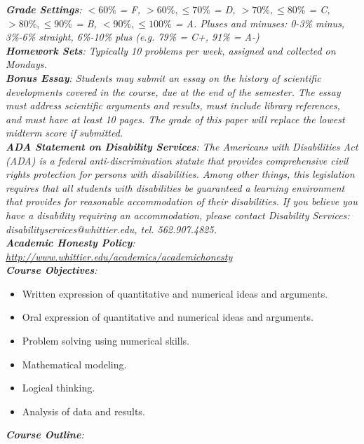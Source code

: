 \documentclass[10pt]{article}
\begin{document}
\textit{\textbf{Grade Settings}: $<60\%$ = F, $>60\%,\leq 70\%$ = D, $>70\%,\leq80\%$ = C, $>80\%,\leq 90\%$ = B, $<90\%,\leq 100\%$ = A.  Pluses and minuses: 0-3\% minus, 3\%-6\% straight, 6\%-10\% plus (e.g. 79\% = C+, 91\% = A-)} \\
\textit{\textbf{Homework Sets}: Typically 10 problems per week, assigned and collected on Mondays.} \\
\textit{\textbf{Bonus Essay}: Students may submit an essay on the history of scientific developments covered in the course, due at the end of the semester.  The essay must address scientific arguments and results, must include library references, and must have at least 10 pages.  The grade of this paper will replace the lowest midterm score if submitted.} \\
\textit{\textbf{ADA Statement on Disability Services}: The Americans with Disabilities Act (ADA) is a federal anti-discrimination statute that provides comprehensive civil rights protection for persons with disabilities. Among other things, this legislation requires that all students with disabilities be guaranteed a learning environment that provides for reasonable accommodation of their disabilities. If you believe you have a disability requiring an accommodation, please contact Disability Services: disabilityservices@whittier.edu, tel. 562.907.4825.} \\
\textit{\textbf{Academic Honesty Policy}: \url{http://www.whittier.edu/academics/academichonesty}} \\
\textit{\textbf{Course Objectives}:}
\begin{itemize}
\item Written expression of quantitative and numerical ideas and arguments.
\item Oral expression of quantitative and numerical ideas and arguments.
\item Problem solving using numerical skills.
\item Mathematical modeling.
\item Logical thinking.
\item Analysis of data and results.
\end{itemize}
\clearpage
\small
\textit{\textbf{Course Outline}:}
\end{document}
